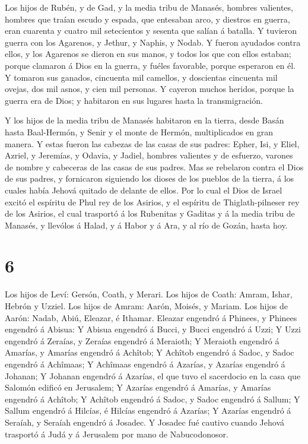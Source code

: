 Los hijos de Rubén, y de Gad, y la media tribu de Manasés,
hombres valientes, hombres que traían escudo y espada, que entesaban
arco, y diestros en guerra, eran cuarenta y cuatro mil setecientos y
sesenta que salían á batalla.  Y tuvieron guerra con los
Agarenos, y Jethur, y Naphis, y Nodab.  Y fueron ayudados
contra ellos, y los Agarenos se dieron en sus manos, y todos los que con
ellos estaban; porque clamaron á Dios en la guerra, y fuéles favorable,
porque esperaron en él.  Y tomaron sus ganados, cincuenta
mil camellos, y doscientas cincuenta mil ovejas, dos mil asnos, y cien
mil personas.  Y cayeron muchos heridos, porque la guerra
era de Dios; y habitaron en sus lugares hasta la transmigración.

 Y los hijos de la media tribu de Manasés habitaron en la
tierra, desde Basán hasta Baal-Hermón, y Senir y el monte de Hermón,
multiplicados en gran manera.  Y estas fueron las cabezas
de las casas de sus padres: Epher, Isi, y Eliel, Azriel, y Jeremías, y
Odavia, y Jadiel, hombres valientes y de esfuerzo, varones de nombre y
cabeceras de las casas de sus padres.  Mas se rebelaron
contra el Dios de sus padres, y fornicaron siguiendo los dioses de los
pueblos de la tierra, á los cuales había Jehová quitado de delante de
ellos.  Por lo cual el Dios de Israel excitó el espíritu de
Phul rey de los Asirios, y el espíritu de Thiglath-pilneser rey de los
Asirios, el cual trasportó á los Rubenitas y Gaditas y á la media tribu
de Manasés, y llevólos á Halad, y á Habor y á Ara, y al río de Gozán,
hasta hoy.

\hypertarget{section-5}{%
\section{6}\label{section-5}}

 Los hijos de Leví: Gersón, Coath, y Merari. 
Los hijos de Coath: Amram, Ishar, Hebrón y Uzziel.  Los
hijos de Amram: Aarón, Moisés, y Mariam. Los hijos de Aarón: Nadab,
Abiú, Eleazar, é Ithamar.  Eleazar engendró á Phinees, y
Phinees engendró á Abisua:  Y Abisua engendró á Bucci, y
Bucci engendró á Uzzi;  Y Uzzi engendró á Zeraías, y Zeraías
engendró á Meraioth;  Y Meraioth engendró á Amarías, y
Amarías engendró á Achîtob;  Y Achîtob engendró á Sadoc, y
Sadoc engendró á Achîmaas;  Y Achîmaas engendró á Azarías, y
Azarías engendró á Johanan;  Y Johanan engendró á Azarías,
el que tuvo el sacerdocio en la casa que Salomón edificó en Jerusalem;
 Y Azarías engendró á Amarías, y Amarías engendró á
Achîtob;  Y Achîtob engendró á Sadoc, y Sadoc engendró á
Sallum;  Y Sallum engendró á Hilcías, é Hilcías engendró á
Azarías;  Y Azarías engendró á Seraíah, y Seraíah engendró
á Josadec.  Y Josadec fué cautivo cuando Jehová trasportó á
Judá y á Jerusalem por mano de Nabucodonosor.

